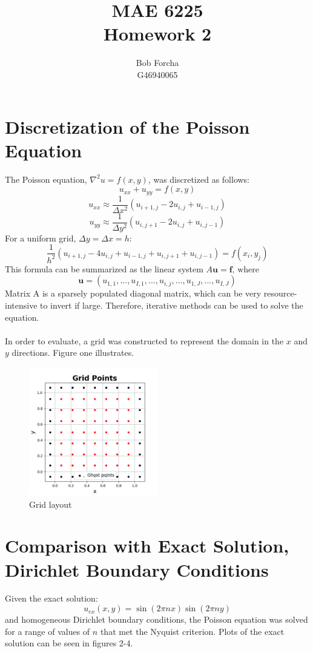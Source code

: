 \documentclass[12pt,a4paper]{report}
\author{Bob Forcha\\G46940065}
\title{MAE 6225\\Homework 2}
\begin{document}
	\begin{titlepage}
		\maketitle
	\end{titlepage}

	\section{Discretization of the Poisson Equation}
		The Poisson equation, $\nabla^2u = f\left(x,y\right)$, was discretized as follows:
		$$u_{xx} + u_{yy} = f\left(x,y\right)$$
		$$u_{xx}\approx\frac{1}{\Delta x^2}\left(u_{i+1,j} - 2u_{i,j} + u_{i-1,j}\right)$$
		$$u_{yy}\approx\frac{1}{\Delta y^2}\left(u_{i,j+1} - 2u_{i,j} + u_{i,j-1}\right)$$
		For a uniform grid, $\Delta y = \Delta x = h$:
		$$\frac{1}{h^2}\left(u_{i+1,j} - 4u_{i,j} + u_{i-1,j} + u_{i,j+1} + u_{i,j-1}\right)
		= f\left(x_i,y_j\right)$$
		This formula can be summarized as the linear system
		$A\mathbf{u} = \mathbf{f}\text{, where}$
		$$\mathbf{u} =\left(u_{1,1},...,u_{I,1},...,u_{i,j},...,u_{1,J},...,u_{I,J}\right)$$
		Matrix A is a sparsely populated diagonal matrix, which can be very resource-intensive
		to invert if large.  Therefore, iterative methods can be used to solve the equation.
		\\
		\\
		In order to evaluate, a grid was constructed to represent the domain in the $x$ and
		$y$ directions. Figure one illustrates.
		
		\begin{figure}
			\centering
				\includegraphics[width=0.5\textwidth]{grid.png}
				\caption{Grid layout}
		\end{figure}
		
		\pagebreak
	\section{Comparison with Exact Solution, Dirichlet Boundary Conditions}
		Given the exact solution:
		$$u_{ex}\left(x,y\right) = \sin\left(2\pi n x\right)\sin\left(2\pi n y\right)$$
		and homogeneous Dirichlet boundary conditions, the Poisson equation was solved for a
		range of values
		of $n$ that met the Nyquist criterion.  Plots of the exact solution can be seen in
		figures 2-4.
\end{document}
